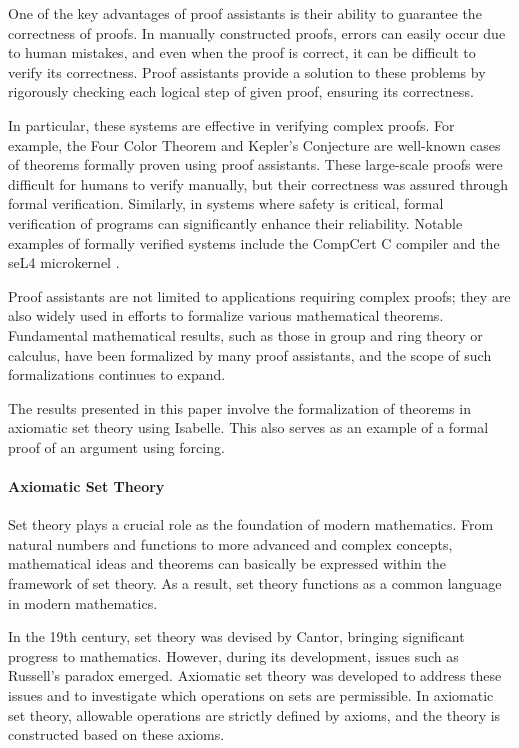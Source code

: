\documentclass{report}
\begin{document}
One of the key advantages of proof assistants is their ability to guarantee the correctness of proofs. 
In manually constructed proofs, errors can easily occur due to human mistakes, 
and even when the proof is correct, it can be difficult to verify its correctness.
Proof assistants provide a solution to these problems by rigorously checking each logical step of given proof,
ensuring its correctness.

In particular, these systems are effective in verifying complex proofs.
For example, the Four Color Theorem \cite{four_color} and Kepler's Conjecture \cite{kepler} are well-known cases of theorems formally proven using proof assistants. 
These large-scale proofs were difficult for humans to verify manually, but their correctness was assured through formal verification.
Similarly, in systems where safety is critical, formal verification of programs can significantly enhance their reliability. 
Notable examples of formally verified systems include the CompCert C compiler \cite{compcert} and the seL4 microkernel \cite{seL4}.

Proof assistants are not limited to applications requiring complex proofs; 
they are also widely used in efforts to formalize various mathematical theorems. 
Fundamental mathematical results, such as those in group and ring theory or calculus, 
have been formalized by many proof assistants, and the scope of such formalizations continues to expand.

The results presented in this paper involve the formalization of theorems in axiomatic set theory using Isabelle. 
This also serves as an example of a formal proof of an argument using forcing.

\paragraph{Axiomatic Set Theory}

Set theory plays a crucial role as the foundation of modern mathematics. 
From natural numbers and functions to more advanced and complex concepts, 
mathematical ideas and theorems can basically be expressed within the framework of set theory. 
As a result, set theory functions as a common language in modern mathematics.

In the 19th century, set theory was devised by Cantor, bringing significant progress to mathematics. 
However, during its development, issues such as Russell's paradox emerged.
Axiomatic set theory was developed to address these issues and to investigate which operations on sets are permissible. 
In axiomatic set theory, allowable operations are strictly defined by axioms, and the theory is constructed based on these axioms.
\end{document}
